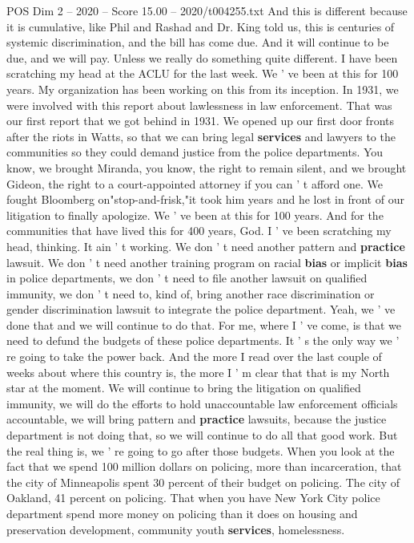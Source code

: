 \begin{textsample}{POS Dim 2 – 2020 – Score 15.00 – 2020/t004255.txt}
And this is different because it is cumulative, like Phil and Rashad and Dr.
King told us, this is centuries of systemic discrimination, and the bill has come due.
And it will continue to be due, and we will pay.
Unless we really do something quite different.
I have been scratching my head at the ACLU for the last week.
We ' ve been at this for 100 years.
My organization has been working on this from its inception.
In 1931, we were involved with this report about lawlessness in law enforcement.
That was our first report that we got behind in 1931.
We opened up our first door fronts after the riots in Watts, so that we can bring legal \textbf{services} and lawyers to the communities so they could demand justice from the police departments.
You know, we brought Miranda, you know, the right to remain silent, and we brought Gideon, the right to a court-appointed attorney if you can ' t afford one.
We fought Bloomberg on"stop-and-frisk,"it took him years and he lost in front of our litigation to finally apologize.
We ' ve been at this for 100 years.
And for the communities that have lived this for 400 years, God.
I ' ve been scratching my head, thinking.
It ain ' t working.
We don ' t need another pattern and \textbf{practice} lawsuit.
We don ' t need another training program on racial \textbf{bias} or implicit \textbf{bias} in police departments, we don ' t need to file another lawsuit on qualified immunity, we don ' t need to, kind of, bring another race discrimination or gender discrimination lawsuit to integrate the police department.
Yeah, we ' ve done that and we will continue to do that.
For me, where I ' ve come, is that we need to defund the budgets of these police departments.
It ' s the only way we ' re going to take the power back.
And the more I read over the last couple of weeks about where this country is, the more I ' m clear that that is my North star at the moment.
We will continue to bring the litigation on qualified immunity, we will do the efforts to hold unaccountable law enforcement officials accountable, we will bring pattern and \textbf{practice} lawsuits, because the justice department is not doing that, so we will continue to do all that good work.
But the real thing is, we ' re going to go after those budgets.
When you look at the fact that we spend 100 million dollars on policing, more than incarceration, that the city of Minneapolis spent 30 percent of their budget on policing.
The city of Oakland, 41 percent on policing.
That when you have New York City police department spend more money on policing than it does on housing and preservation development, community youth \textbf{services}, homelessness.

\end{textsample}
